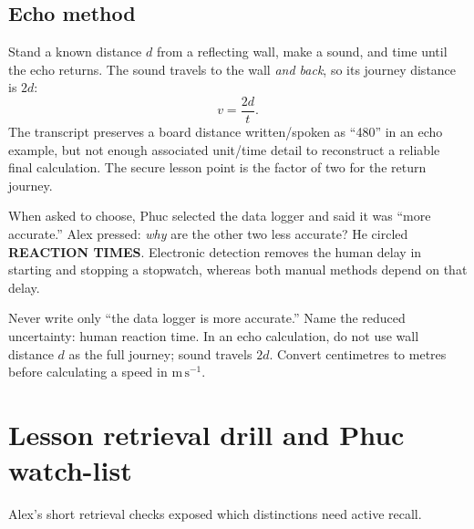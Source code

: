 \documentclass[11pt,a4paper]{article}
\newcommand{\trap}[1]{\begin{mistakebox}#1\end{mistakebox}}
\begin{document}
\subsection{Echo method}
Stand a known distance $d$ from a reflecting wall, make a sound, and time until the echo returns. The sound travels to the wall \emph{and back}, so its journey distance is $2d$:
\[
v=\frac{2d}{t}.
\]
The transcript preserves a board distance written/spoken as ``480'' in an echo example, but not enough associated unit/time detail to reconstruct a reliable final calculation. The secure lesson point is the factor of two for the return journey.

\begin{center}
\end{center}

When asked to choose, Phuc selected the data logger and said it was ``more accurate.'' Alex pressed: \emph{why} are the other two less accurate? He circled \textbf{REACTION TIMES}. Electronic detection removes the human delay in starting and stopping a stopwatch, whereas both manual methods depend on that delay.

\trap{Never write only ``the data logger is more accurate.'' Name the reduced uncertainty: human reaction time. In an echo calculation, do not use wall distance $d$ as the full journey; sound travels $2d$. Convert centimetres to metres before calculating a speed in $\mathrm{m\,s^{-1}}$.}

\section{Lesson retrieval drill and Phuc watch-list}
Alex's short retrieval checks exposed which distinctions need active recall.
\end{document}
